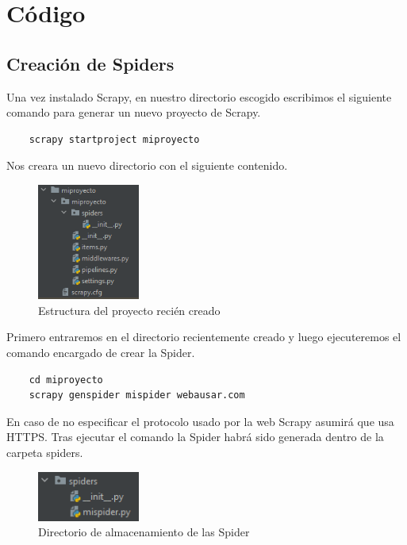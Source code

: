 \chapter[Código]{Código}
\label{Chap5}

\section{Creación de Spiders}
Una vez instalado Scrapy, en nuestro directorio escogido escribimos el siguiente comando para generar un nuevo proyecto de Scrapy.

\begin{verbatim}
	scrapy startproject miproyecto
\end{verbatim}

Nos creara un nuevo directorio con el siguiente contenido.

\begin{figure} [h!]
	\centering
	\includegraphics[width=0.3\textwidth]{fig/estructura_proyecto_scrapy.png}
	\caption[Estructura del proyecto recién creado]{Estructura del proyecto recién creado}
	\label{fig:ej11}
\end{figure}

Primero entraremos en el directorio recientemente creado y luego ejecuteremos el comando encargado de crear la Spider.

\begin{verbatim}
	cd miproyecto
	scrapy genspider mispider webausar.com
\end{verbatim}

En caso de no especificar el protocolo usado por la web Scrapy asumirá que usa HTTPS.
\newline
Tras ejecutar el comando la Spider habrá sido generada dentro de la carpeta spiders.

\begin{figure} [h!]
	\centering
	\includegraphics[width=0.3\textwidth]{fig/primera_spider.png}
	\caption[Directorio de almacenamiento de las Spider]{Directorio de almacenamiento de las Spider}
	\label{fig:ej12}
\end{figure}

